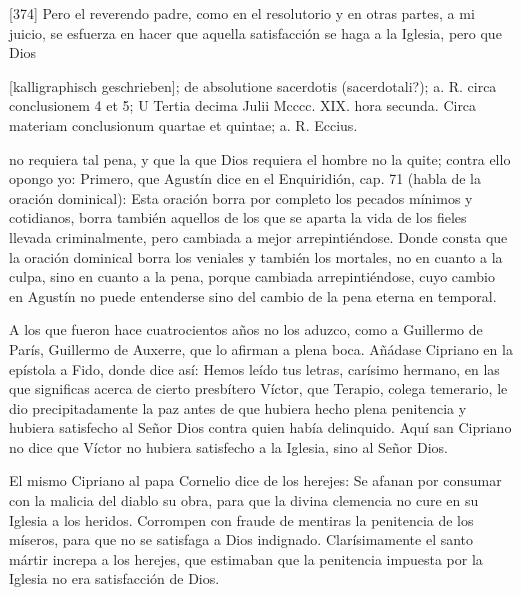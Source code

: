 [374] Pero el reverendo padre, como en el resolutorio y en otras partes, a mi juicio, se esfuerza en hacer que aquella satisfacción se haga a la Iglesia, pero que Dios

[kalligraphisch geschrieben]; de absolutione sacerdotis (sacerdotali?); a. R. circa conclusionem 4 et 5; U Tertia decima Julii Mcccc. XIX. hora secunda. Circa materiam conclusionum quartae et quintae; a. R. Eccius.

no requiera tal pena, y que la que Dios requiera el hombre no la quite; contra ello opongo yo: Primero, que Agustín dice en el Enquiridión, cap. 71 (habla de la oración dominical): Esta oración borra por completo los pecados mínimos y cotidianos, borra también aquellos de los que se aparta la vida de los fieles llevada criminalmente, pero cambiada a mejor arrepintiéndose. Donde consta que la oración dominical borra los veniales y también los mortales, no en cuanto a la culpa, sino en cuanto a la pena, porque cambiada arrepintiéndose, cuyo cambio en Agustín no puede entenderse sino del cambio de la pena eterna en temporal.

A los que fueron hace cuatrocientos años no los aduzco, como a Guillermo de París, Guillermo de Auxerre, que lo afirman a plena boca. Añádase Cipriano en la epístola a Fido, donde dice así: Hemos leído tus letras, carísimo hermano, en las que significas acerca de cierto presbítero Víctor, que Terapio, colega temerario, le dio precipitadamente la paz antes de que hubiera hecho plena penitencia y hubiera satisfecho al Señor Dios contra quien había delinquido. Aquí san Cipriano no dice que Víctor no hubiera satisfecho a la Iglesia, sino al Señor Dios.

El mismo Cipriano al papa Cornelio dice de los herejes: Se afanan por consumar con la malicia del diablo su obra, para que la divina clemencia no cure en su Iglesia a los heridos. Corrompen con fraude de mentiras la penitencia de los míseros, para que no se satisfaga a Dios indignado. Clarísimamente el santo mártir increpa a los herejes, que estimaban que la penitencia impuesta por la Iglesia no era satisfacción de Dios.

